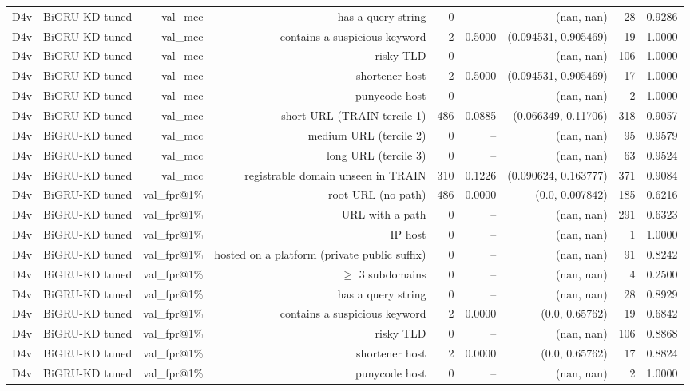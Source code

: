 \begin{table}[t]
\begin{tabular}{llrrrrrrr}
D4v & BiGRU-KD tuned & val\_mcc & has a query string & 0 & -- & (nan, nan) & 28 & 0.9286 \\
D4v & BiGRU-KD tuned & val\_mcc & contains a suspicious keyword & 2 & 0.5000 & (0.094531, 0.905469) & 19 & 1.0000 \\
D4v & BiGRU-KD tuned & val\_mcc & risky TLD & 0 & -- & (nan, nan) & 106 & 1.0000 \\
D4v & BiGRU-KD tuned & val\_mcc & shortener host & 2 & 0.5000 & (0.094531, 0.905469) & 17 & 1.0000 \\
D4v & BiGRU-KD tuned & val\_mcc & punycode host & 0 & -- & (nan, nan) & 2 & 1.0000 \\
D4v & BiGRU-KD tuned & val\_mcc & short URL (TRAIN tercile 1) & 486 & 0.0885 & (0.066349, 0.11706) & 318 & 0.9057 \\
D4v & BiGRU-KD tuned & val\_mcc & medium URL (tercile 2) & 0 & -- & (nan, nan) & 95 & 0.9579 \\
D4v & BiGRU-KD tuned & val\_mcc & long URL (tercile 3) & 0 & -- & (nan, nan) & 63 & 0.9524 \\
D4v & BiGRU-KD tuned & val\_mcc & registrable domain unseen in TRAIN & 310 & 0.1226 & (0.090624, 0.163777) & 371 & 0.9084 \\
D4v & BiGRU-KD tuned & val\_fpr@1\% & root URL (no path) & 486 & 0.0000 & (0.0, 0.007842) & 185 & 0.6216 \\
D4v & BiGRU-KD tuned & val\_fpr@1\% & URL with a path & 0 & -- & (nan, nan) & 291 & 0.6323 \\
D4v & BiGRU-KD tuned & val\_fpr@1\% & IP host & 0 & -- & (nan, nan) & 1 & 1.0000 \\
D4v & BiGRU-KD tuned & val\_fpr@1\% & hosted on a platform (private public suffix) & 0 & -- & (nan, nan) & 91 & 0.8242 \\
D4v & BiGRU-KD tuned & val\_fpr@1\% & $\geq$ 3 subdomains & 0 & -- & (nan, nan) & 4 & 0.2500 \\
D4v & BiGRU-KD tuned & val\_fpr@1\% & has a query string & 0 & -- & (nan, nan) & 28 & 0.8929 \\
D4v & BiGRU-KD tuned & val\_fpr@1\% & contains a suspicious keyword & 2 & 0.0000 & (0.0, 0.65762) & 19 & 0.6842 \\
D4v & BiGRU-KD tuned & val\_fpr@1\% & risky TLD & 0 & -- & (nan, nan) & 106 & 0.8868 \\
D4v & BiGRU-KD tuned & val\_fpr@1\% & shortener host & 2 & 0.0000 & (0.0, 0.65762) & 17 & 0.8824 \\
D4v & BiGRU-KD tuned & val\_fpr@1\% & punycode host & 0 & -- & (nan, nan) & 2 & 1.0000 \\

\end{tabular}
\end{table}
